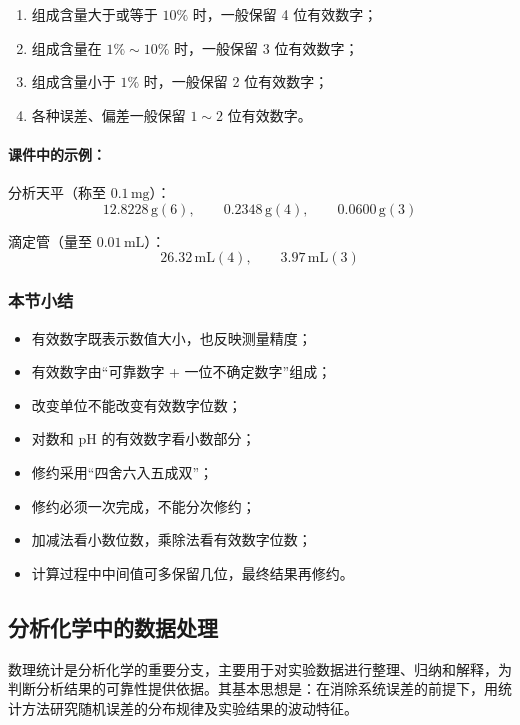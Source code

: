 \documentclass[12pt,a4paper]{article}
\numberwithin{equation}{section}
\begin{document}
\begin{enumerate}
    \item 组成含量大于或等于 $10\%$ 时，一般保留 4 位有效数字；
    \item 组成含量在 $1\%\sim 10\%$ 时，一般保留 3 位有效数字；
    \item 组成含量小于 $1\%$ 时，一般保留 2 位有效数字；
    \item 各种误差、偏差一般保留 $1\sim 2$ 位有效数字。
\end{enumerate}

\paragraph{课件中的示例：}
分析天平（称至 $0.1\,\mathrm{mg}$）：
\begin{equation}
12.8228\,\mathrm{g}(6),\qquad 0.2348\,\mathrm{g}(4),\qquad 0.0600\,\mathrm{g}(3)
\end{equation}

滴定管（量至 $0.01\,\mathrm{mL}$）：
\begin{equation}
26.32\,\mathrm{mL}(4),\qquad 3.97\,\mathrm{mL}(3)
\end{equation}

\subsubsection{本节小结}

\begin{itemize}
    \item 有效数字既表示数值大小，也反映测量精度；
    \item 有效数字由“可靠数字 + 一位不确定数字”组成；
    \item 改变单位不能改变有效数字位数；
    \item 对数和 $\mathrm{pH}$ 的有效数字看小数部分；
    \item 修约采用“四舍六入五成双”；
    \item 修约必须一次完成，不能分次修约；
    \item 加减法看小数位数，乘除法看有效数字位数；
    \item 计算过程中中间值可多保留几位，最终结果再修约。
\end{itemize}


\subsection{分析化学中的数据处理}

数理统计是分析化学的重要分支，主要用于对实验数据进行整理、归纳和解释，为判断分析结果的可靠性提供依据。其基本思想是：在消除系统误差的前提下，用统计方法研究随机误差的分布规律及实验结果的波动特征。
\end{document}
